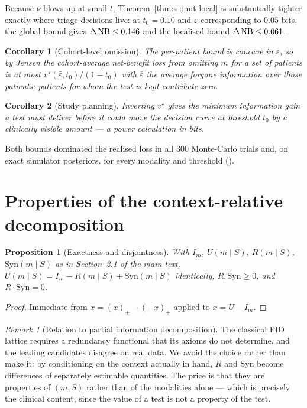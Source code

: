 \documentclass[11pt]{article}
\newtheorem{proposition}{Proposition}
\newtheorem{corollary}{Corollary}
\theoremstyle{definition}
\theoremstyle{remark}
\newtheorem{remark}{Remark}
\DeclareMathOperator{\NB}{NB}
\begin{document}
Because $\nu$ blows up at small $t$, Theorem~\ref{thm:s-omit-local} is
substantially tighter exactly where triage decisions live: at $t_0=0.10$ and
$\varepsilon$ corresponding to $0.05$ bits, the global bound gives
$\Delta\NB\le\exGlobalNb$ and the localised bound $\Delta\NB\le\exLocalNb$.

\begin{corollary}[Cohort-level omission]
The per-patient bound is concave in $\varepsilon$, so by Jensen the
cohort-average net-benefit loss from omitting $m$ for a set of patients is at
most $v^\star(\bar\varepsilon,t_0)/(1-t_0)$ with $\bar\varepsilon$ the average
forgone information over those patients; patients for whom the test is kept
contribute zero.
\end{corollary}

\begin{corollary}[Study planning]
Inverting $v^\star$ gives the minimum information gain a test must deliver before
it could move the decision curve at threshold $t_0$ by a clinically visible
amount --- a power calculation in bits.
\end{corollary}

Both bounds dominated the realised loss in all $300$ Monte-Carlo trials and, on
exact simulator posteriors, for every modality and threshold (\simThmTwoHolds).

\section{Properties of the context-relative decomposition}
\label{sec:s-decomp}
\label{sec:decomp-props}

\begin{proposition}[Exactness and disjointness]
With $I_m$, $U(m\mid S)$, $R(m\mid S)$, $\mathrm{Syn}(m\mid S)$ as in
Section~2.1 of the main text,
$U(m\mid S)=I_m-R(m\mid S)+\mathrm{Syn}(m\mid S)$ identically,
$R,\mathrm{Syn}\ge0$, and $R\cdot\mathrm{Syn}=0$.
\end{proposition}

\begin{proof}
Immediate from $x=(x)_+-(-x)_+$ applied to $x=U-I_m$.
\end{proof}

\begin{remark}[Relation to partial information decomposition]
The classical PID lattice \citep{williams2010pid} requires a redundancy
functional that its axioms do not determine, and the leading candidates
\citep{bertschinger2014uniqueinfo,griffith2014synergy} disagree on real data. We
avoid the choice rather than make it: by conditioning on the context actually in
hand, $R$ and $\mathrm{Syn}$ become differences of separately estimable
quantities. The price is that they are properties of $(m,S)$ rather than of the
modalities alone --- which is precisely the clinical content, since the value of
a test is not a property of the test.
\end{remark}
\end{document}
